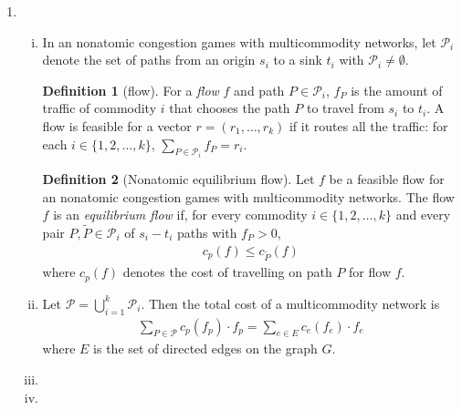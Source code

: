 \documentclass[a4paper,12pt]{article}
\theoremstyle{definition}
\newtheorem*{defn}{Definition}
\begin{document}
\begin{enumerate}
\item 
\begin{enumerate}[(i)]
\item In an nonatomic congestion games with multicommodity networks, let $\mathcal{P}_i$ denote the set of paths from an origin $s_i$ to a sink $t_i$ with $\mathcal{P}_i\neq \emptyset$.
\begin{defn}[flow]
For a \emph{flow} $f$ and path $P \in \mathcal{P}_i$, $f_P$ is the amount of traffic of commodity $i$ that chooses the path $P$ to travel from $s_i$ to $t_i$. A flow is feasible for a vector $r=(r_1,\ldots,r_k)$ if it routes all the traffic: for each $i\in \{1, 2, \ldots, k\}$, $\sum_{P\in \mathcal{P}_i}f_P=r_i$.
\end{defn}
\begin{defn}[Nonatomic equilibrium flow]
Let $f$ be a feasible flow for an nonatomic congestion games with multicommodity networks. The flow $f$ is an \emph{equilibrium flow} if, for every commodity $i \in \{1,2, \ldots, k\}$ and every pair $P, \tilde{P} \in \mathcal{P}_i$ of $s_i-t_i$ paths with $f_P>0$, 
\begin{align*}
c_p(f) \leq c_{\tilde{P}}(f)
\end{align*}
where $c_p(f)$ denotes the cost of travelling on path $P$ for flow $f$.
\end{defn}
\item Let $\mathcal{P}=\bigcup_{i=1}^{k}\mathcal{P}_i$. Then the total cost of a multicommodity network is 
\begin{align*}
\sum_{P\in \mathcal{P}}c_p(f_p)\cdot f_p = \sum_{e\in E}c_e(f_e)\cdot f_e
\end{align*}
where $E$ is the set of directed edges on the graph $G$.
\item
\item 
\end{enumerate}


\end{enumerate}
\end{document}
